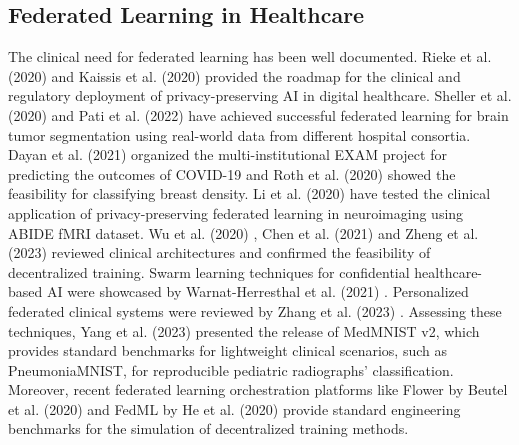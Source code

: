 \documentclass[12pt,a4paper]{report}
\begin{document}
\subsection{Federated Learning in Healthcare}
The clinical need for federated learning has been well documented. Rieke et al. (2020) \cite{rieke2020future} and Kaissis et al. (2020) \cite{kaissis2020secure} provided the roadmap for the clinical and regulatory deployment of privacy-preserving AI in digital healthcare. Sheller et al. (2020) \cite{sheller2020federated} and Pati et al. (2022) \cite{pati2022fets} have achieved successful federated learning for brain tumor segmentation using real-world data from different hospital consortia. Dayan et al. (2021) \cite{dayan2021exam} organized the multi-institutional EXAM project for predicting the outcomes of COVID-19 and Roth et al. (2020) \cite{roth2020breast} showed the feasibility for classifying breast density. Li et al. (2020) \cite{li2020multi} have tested the clinical application of privacy-preserving federated learning in neuroimaging using ABIDE fMRI dataset. Wu et al. (2020) \cite{wu2020federated}, Chen et al. (2021) \cite{chen2021fedhealth} and Zheng et al. (2023) \cite{zheng2023federated} reviewed clinical architectures and confirmed the feasibility of decentralized training. Swarm learning techniques for confidential healthcare-based AI were showcased by Warnat-Herresthal et al. (2021) \cite{warnat2021swarm}. Personalized federated clinical systems were reviewed by Zhang et al. (2023) \cite{zhang2023personalized}. Assessing these techniques, Yang et al. (2023) \cite{yang2023medmnist} presented the release of MedMNIST v2, which provides standard benchmarks for lightweight clinical scenarios, such as PneumoniaMNIST, for reproducible pediatric radiographs' classification. Moreover, recent federated learning orchestration platforms like Flower by Beutel et al. (2020) \cite{beutel2020flower} and FedML by He et al. (2020) \cite{he2020fedml} provide standard engineering benchmarks for the simulation of decentralized training methods.
\end{document}
